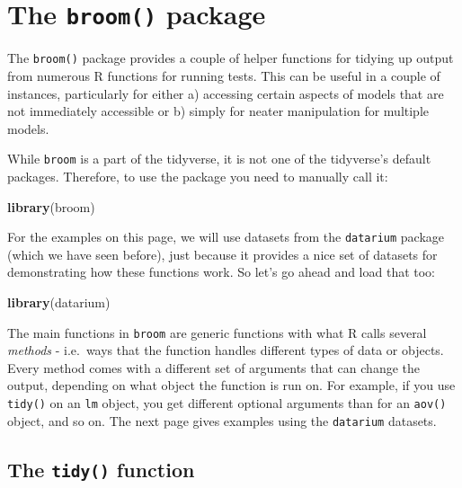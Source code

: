 \documentclass[
]{book}
\newenvironment{Shaded}{\begin{snugshade}}{\end{snugshade}}
\newcommand{\FunctionTok}[1]{\textcolor[rgb]{0.13,0.29,0.53}{\textbf{#1}}}
\newcommand{\NormalTok}[1]{#1}
\begin{document}
\hypertarget{broom}{%
\chapter{\texorpdfstring{The \texttt{broom()} package}{The broom() package}}\label{broom}}

The \texttt{broom()} package provides a couple of helper functions for tidying up output from numerous R functions for running tests. This can be useful in a couple of instances, particularly for either a) accessing certain aspects of models that are not immediately accessible or b) simply for neater manipulation for multiple models.

While \texttt{broom} is a part of the tidyverse, it is not one of the tidyverse's default packages. Therefore, to use the package you need to manually call it:

\begin{Shaded}
\begin{Highlighting}[]
\FunctionTok{library}\NormalTok{(broom)}
\end{Highlighting}
\end{Shaded}

For the examples on this page, we will use datasets from the \texttt{datarium} package (which we have seen before), just because it provides a nice set of datasets for demonstrating how these functions work. So let's go ahead and load that too:

\begin{Shaded}
\begin{Highlighting}[]
\FunctionTok{library}\NormalTok{(datarium)}
\end{Highlighting}
\end{Shaded}

The main functions in \texttt{broom} are generic functions with what R calls several \emph{methods} - i.e.~ways that the function handles different types of data or objects. Every method comes with a different set of arguments that can change the output, depending on what object the function is run on. For example, if you use \texttt{tidy()} on an \texttt{lm} object, you get different optional arguments than for an \texttt{aov()} object, and so on. The next page gives examples using the \texttt{datarium} datasets.

\hypertarget{broom-tidy}{%
\section{\texorpdfstring{The \texttt{tidy()} function}{The tidy() function}}\label{broom-tidy}}
\end{document}
